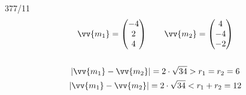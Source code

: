 \begin{exercise}{377/11}
\begin{gather*}
    \vv{m_1} = \begin{pmatrix}-4 \\ 2 \\ 4\end{pmatrix} \qquad \vv{m_2} = \begin{pmatrix}4 \\ -4 \\ -2\end{pmatrix} \\\\
    |\vv{m_1} - \vv{m_2}| = 2 \cdot \sqrt{34} > r_1 = r_2 = 6 \\
    |\vv{m_1} - \vv{m_2}| = 2 \cdot \sqrt{34} < r_1 + r_2 = 12
  \end{gather*}
\end{exercise}
